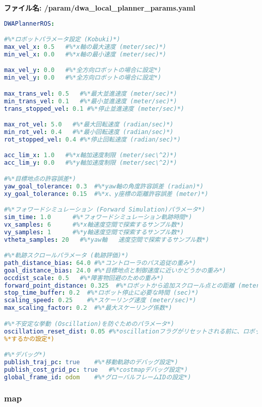 \textbf{ファイル名: /param/dwa\_local\_planner\_params.yaml}
\begin{lstlisting}[language=YAML]
DWAPlannerROS:

#%*ロボットパラメータ設定 (Kobuki)*)
max_vel_x: 0.5   #%*x軸の最大速度 (meter/sec)*)
min_vel_x: 0.0   #%*x軸の最小速度 (meter/sec)*)

max_vel_y: 0.0   #%*全方向ロボットの場合に設定*)
min_vel_y: 0.0   #%*全方向ロボットの場合に設定*)

max_trans_vel: 0.5   #%*最大並進速度 (meter/sec)*)
min_trans_vel: 0.1   #%*最小並進速度 (meter/sec)*)
trans_stopped_vel: 0.1 #%*停止並進速度 (meter/sec)*)

max_rot_vel: 5.0   #%*最大回転速度 (radian/sec)*)
min_rot_vel: 0.4   #%*最小回転速度 (radian/sec)*)
rot_stopped_vel: 0.4 #%*停止回転速度 (radian/sec)*)

acc_lim_x: 1.0   #%*x軸加速度制限 (meter/sec\^2)*)
acc_lim_y: 0.0   #%*y軸加速度制限 (meter/sec\^2)*)

#%*目標地点の許容誤差*)
yaw_goal_tolerance: 0.3  #%*yaw軸の角度許容誤差 (radian)*)
xy_goal_tolerance: 0.15  #%*x、y座標の距離許容誤差 (meter)*)

#%*フォワードシミュレーション (Forward Simulation)パラメータ*)
sim_time: 1.0      #%*フォワードシミュレーション軌跡時間*)
vx_samples: 6      #%*x軸速度空間で探索するサンプル数*)
vy_samples: 1      #%*y軸速度空間で探索するサンプル数*)
vtheta_samples: 20   #%*yaw軸   速度空間で探索するサンプル数*)

#%*軌跡スクロールパラメータ (軌跡評価)*)
path_distance_bias: 64.0 #%*コントローラのパス追従の重み*)
goal_distance_bias: 24.0 #%*目標地点と制御速度に近いかどうかの重み*)
occdist_scale: 0.5   #%*障害物回避のための重み*)
forward_point_distance: 0.325  #%*ロボットから追加スクロール点との距離 (meter)*)
stop_time_buffer: 0.2  #%*ロボット停止に必要な時間 (sec)*)
scaling_speed: 0.25    #%*スケーリング速度 (meter/sec)*)
max_scaling_factor: 0.2  #%*最大スケーリング係数*)

#%*不安定な挙動 (Oscillation)を防ぐためのパラメータ*)
oscillation_reset_dist: 0.05 #%*oscillationフラグがリセットされる前に、ロボットがどのように移動*)
%*するかの設定*)

#%*デバッグ*)
publish_traj_pc: true    #%*移動軌跡のデバッグ設定*)
publish_cost_grid_pc: true   #%*costmapデバッグ設定*)
global_frame_id: odom    #%*グローバルフレームIDの設定*)
\end{lstlisting}

\subsubsection{map}

